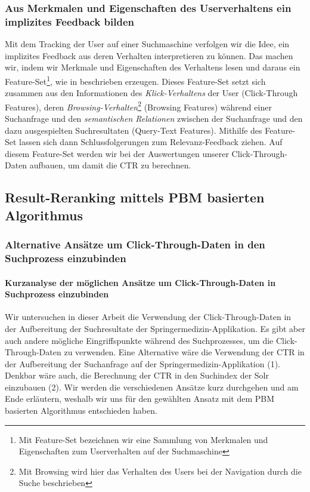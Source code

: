 \subsubsection{Aus Merkmalen und Eigenschaften des Userverhaltens ein implizites Feedback bilden}
\label{sec:Grundlagen:Grundbegriffe:Click-Through-Daten:UserverhaltensFeedback}

Mit dem Tracking der User auf einer Suchmaschine verfolgen wir die Idee, ein implizites Feedback aus deren Verhalten interpretieren zu können. Das machen wir, indem wir Merkmale und Eigenschaften des Verhaltens lesen und daraus ein Feature-Set\footnote{Mit Feature-Set bezeichnen wir eine Sammlung von Merkmalen und Eigenschaften zum Userverhalten auf der Suchmaschine}, wie in \cite{IWUSBI} beschrieben erzeugen. Dieses Feature-Set setzt sich zusammen aus den Informationen des \textit{Klick-Verhaltens} der User (Click-Through Features), deren \textit{Browsing-Verhalten}\footnote{Mit Browsing wird hier das Verhalten des Users bei der Navigation durch die Suche beschrieben} (Browsing Features) während einer Suchanfrage und den \textit{semantischen Relationen} zwischen der Suchanfrage und den dazu ausgespielten Suchresultaten (Query-Text Features). Mithilfe des Feature-Set lassen sich dann  Schlussfolgerungen zum Relevanz-Feedback ziehen. Auf diesem Feature-Set werden wir bei der Auswertungen unserer Click-Through-Daten aufbauen, um damit die CTR zu berechnen.


\subsection{Result-Reranking mittels PBM basierten Algorithmus}
\label{sec:Grundlagen:Grundbegriffe:Result-RerankingPBM}

\subsubsection{Alternative Ansätze um Click-Through-Daten in den Suchprozess einzubinden}
\label{sec:Grundlagen:Grundbegriffe:Result-RerankingPBM:AlternativenSucheEinbinden}

\paragraph{Kurzanalyse der möglichen Ansätze um Click-Through-Daten in Suchprozess einzubinden} 
Wir untersuchen in dieser Arbeit die Verwendung der Click-Through-Daten in der Aufbereitung der Suchresultate der Springermedizin-Applikation. Es gibt aber auch andere mögliche Eingriffspunkte während des Suchprozesses, um die Click-Through-Daten zu verwenden. Eine Alternative wäre die Verwendung der CTR in der Aufbereitung der Suchanfrage auf der Springermedizin-Applikation (1). Denkbar wäre auch, die Berechnung der CTR in den Suchindex der Solr einzubauen (2). Wir werden die verschiedenen Ansätze kurz durchgehen und am Ende erläutern, weshalb wir uns für den gewählten Ansatz mit dem PBM basierten Algorithmus entschieden haben.

